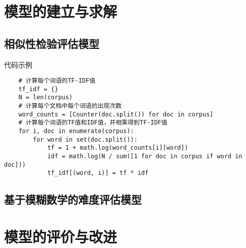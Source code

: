 \section{模型的建立与求解}

\subsection{相似性检验评估模型}

代码示例

\begin{verbatim}
    # 计算每个词语的TF-IDF值
    tf_idf = {}
    N = len(corpus)
    # 计算每个文档中每个词语的出现次数
    word_counts = [Counter(doc.split()) for doc in corpus]
    # 计算每个词语的TF值和IDF值，并相乘得到TF-IDF值
    for i, doc in enumerate(corpus):
        for word in set(doc.split()):
            tf = 1 + math.log(word_counts[i][word])
            idf = math.log(N / sum([1 for doc in corpus if word in doc]))
            tf_idf[(word, i)] = tf * idf
\end{verbatim}

\subsection{基于模糊数学的难度评估模型}

\subsection{}

\section{模型的评价与改进}

